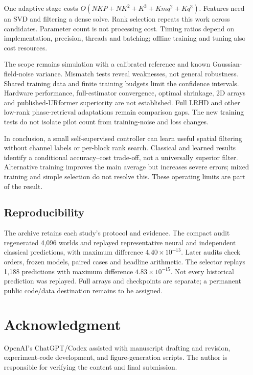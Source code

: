 \documentclass[10pt,journal,letterpaper]{IEEEtran}
\begin{document}
One adaptive stage costs $O(NKP+NK^2+K^3+Kmq^2+Kq^3)$. Features need an SVD and filtering a dense solve. Rank selection repeats this work across candidates. Parameter count is not processing cost. Timing ratios depend on implementation, precision, threads and batching; offline training and tuning also cost resources.

The scope remains simulation with a calibrated reference and known Gaussian-field-noise variance. Mismatch tests reveal weaknesses, not general robustness. Shared training data and finite training budgets limit the confidence intervals. Hardware performance, full-estimator convergence, optimal shrinkage, 2D arrays and published-URformer superiority are not established. Full LRHD and other low-rank phase-retrieval adaptations remain comparison gaps. The new training tests do not isolate pilot count from training-noise and loss changes.

In conclusion, a small self-supervised controller can learn useful spatial filtering without channel labels or per-block rank search. Classical and learned results identify a conditional accuracy--cost trade-off, not a universally superior filter. Alternative training improves the main average but increases severe errors; mixed training and simple selection do not resolve this. These operating limits are part of the result.

\subsection{Reproducibility}
The archive retains each study's protocol and evidence. The compact audit regenerated 4,096 worlds and replayed representative neural and independent classical predictions, with maximum difference $4.40\times10^{-13}$. Later audits check orders, frozen models, paired cases and headline arithmetic. The selector replays 1,188 predictions with maximum difference $4.83\times10^{-15}$. Not every historical prediction was replayed. Full arrays and checkpoints are separate; a permanent public code/data destination remains to be assigned.

\section*{Acknowledgment}
OpenAI's ChatGPT/Codex assisted with manuscript drafting and revision, experiment-code development, and figure-generation scripts. The author is responsible for verifying the content and final submission.


\end{document}
